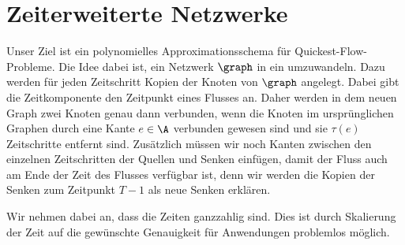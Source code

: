 \section{Zeiterweiterte Netzwerke}

Unser Ziel ist ein polynomielles Approximationsschema für Quickest-Flow-Probleme.
Die Idee dabei ist, ein Netzwerk $\graph$ in ein 
umzuwandeln. Dazu werden für jeden Zeitschritt Kopien der Knoten von $\graph$
angelegt. Dabei gibt die Zeitkomponente den Zeitpunkt eines Flusses an. Daher
werden in dem neuen Graph zwei Knoten genau dann verbunden, wenn die Knoten
im ursprünglichen Graphen durch eine Kante $e \in \A$ verbunden gewesen sind und
sie $\tau(e)$ Zeitschritte entfernt sind. Zusätzlich müssen wir noch Kanten
zwischen den einzelnen Zeitschritten der Quellen und Senken einfügen, damit
der Fluss auch am Ende der Zeit des Flusses verfügbar ist, denn wir werden
die Kopien der Senken zum Zeitpunkt $T-1$ als neue Senken erklären.

Wir nehmen dabei an, dass die Zeiten ganzzahlig sind. Dies ist durch Skalierung
der Zeit auf die gewünschte Genauigkeit für Anwendungen problemlos möglich.

